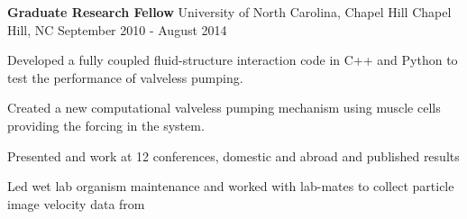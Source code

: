 \begin{cventries}
  \cventry
    {\textbf{Graduate Research Fellow}} %
    {University of North Carolina, Chapel Hill} %
    {Chapel Hill, NC} %
    {September 2010 - August 2014} %
    {
      \begin{cvitems} %
        \item {Developed a fully coupled fluid-structure interaction code in C++ and Python to test the performance of valveless pumping.}
		\item {Created a new computational valveless pumping mechanism using muscle cells providing the forcing in the system.}
		\item {Presented and work at 12 conferences, domestic and abroad and published results}
    \item {Led wet lab organism maintenance and worked with lab-mates to collect particle image velocity data from}
      \end{cvitems}
    }

\end{cventries}
